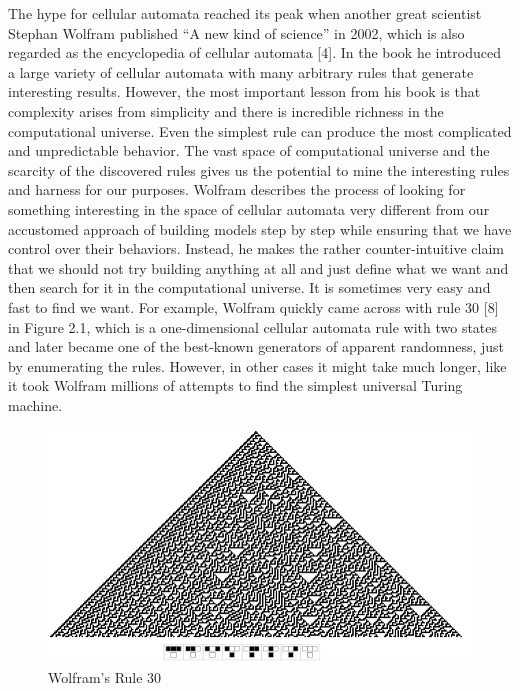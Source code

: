 \documentclass[12pt]{article}
\numberwithin{figure}{section} %
\begin{document}
The hype for cellular automata reached its peak when another great scientist Stephan Wolfram published “A new kind of science” in 2002, which is also regarded as the encyclopedia of cellular automata [4]. In the book he introduced a large variety of cellular automata with many arbitrary rules that generate interesting results. However, the most important lesson from his book is that complexity arises from simplicity and there is incredible richness in the computational universe. Even the simplest rule can produce the most complicated and unpredictable behavior. The vast space of computational universe and the scarcity of the discovered rules gives us the potential to mine the interesting rules and harness for our purposes. Wolfram describes the process of looking for something interesting in the space of cellular automata very different from our accustomed approach of building models step by step while ensuring that we have control over their behaviors. Instead, he makes the rather counter-intuitive claim that we should not try building anything at all and just define what we want and then search for it in the computational universe. It is sometimes very easy and fast to find we want. For example, Wolfram quickly came across with rule 30 [8] in Figure 2.1, which is a one-dimensional cellular automata rule with two states and later became one of the best-known generators of apparent randomness, just by enumerating the rules. However, in other cases it might take much longer, like it took Wolfram millions of attempts to find the simplest universal Turing machine. 
 
\begin{figure}[H]
\includegraphics[width=\linewidth]{Section2/1}
\caption{Wolfram’s Rule 30}
\vspace{-1.5em}
\end{figure}
\end{document}
